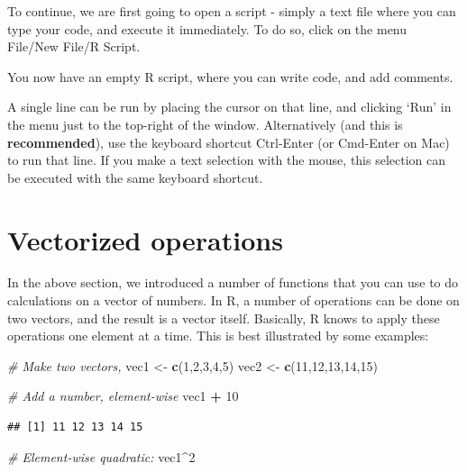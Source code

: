 \documentclass[]{book}
\newenvironment{Shaded}{\begin{snugshade}}{\end{snugshade}}
\newcommand{\CommentTok}[1]{\textcolor[rgb]{0.56,0.35,0.01}{\textit{#1}}}
\newcommand{\DecValTok}[1]{\textcolor[rgb]{0.00,0.00,0.81}{#1}}
\newcommand{\KeywordTok}[1]{\textcolor[rgb]{0.13,0.29,0.53}{\textbf{#1}}}
\newcommand{\NormalTok}[1]{#1}
\newcommand{\OperatorTok}[1]{\textcolor[rgb]{0.81,0.36,0.00}{\textbf{#1}}}
\newcommand{\StringTok}[1]{\textcolor[rgb]{0.31,0.60,0.02}{#1}}
\begin{document}
To continue, we are first going to open a script - simply a text file where you can type your code, and execute it immediately. To do so, click on the menu File/New File/R Script.

You now have an empty R script, where you can write code, and add comments.

A single line can be run by placing the cursor on that line, and clicking `Run' in the menu just to the top-right of the window. Alternatively (and this is \textbf{recommended}), use the keyboard shortcut Ctrl-Enter (or Cmd-Enter on Mac) to run that line. If you make a text selection with the mouse, this selection can be executed with the same keyboard shortcut.

\hypertarget{vectorized}{%
\section{Vectorized operations}\label{vectorized}}

In the above section, we introduced a number of functions that you can use to do calculations on a vector of numbers. In R, a number of operations can be done on two vectors, and the result is a vector itself. Basically, R knows to apply these operations one element at a time. This is best illustrated by some examples:

\begin{Shaded}
\begin{Highlighting}[]
\CommentTok{# Make two vectors,}
\NormalTok{vec1 <-}\StringTok{ }\KeywordTok{c}\NormalTok{(}\DecValTok{1}\NormalTok{,}\DecValTok{2}\NormalTok{,}\DecValTok{3}\NormalTok{,}\DecValTok{4}\NormalTok{,}\DecValTok{5}\NormalTok{)}
\NormalTok{vec2 <-}\StringTok{ }\KeywordTok{c}\NormalTok{(}\DecValTok{11}\NormalTok{,}\DecValTok{12}\NormalTok{,}\DecValTok{13}\NormalTok{,}\DecValTok{14}\NormalTok{,}\DecValTok{15}\NormalTok{)}

\CommentTok{# Add a number, element-wise}
\NormalTok{vec1 }\OperatorTok{+}\StringTok{ }\DecValTok{10}
\end{Highlighting}
\end{Shaded}

\begin{verbatim}
## [1] 11 12 13 14 15
\end{verbatim}

\begin{Shaded}
\begin{Highlighting}[]
\CommentTok{# Element-wise quadratic:}
\NormalTok{vec1}\OperatorTok{^}\DecValTok{2}
\end{Highlighting}
\end{Shaded}
\end{document}
